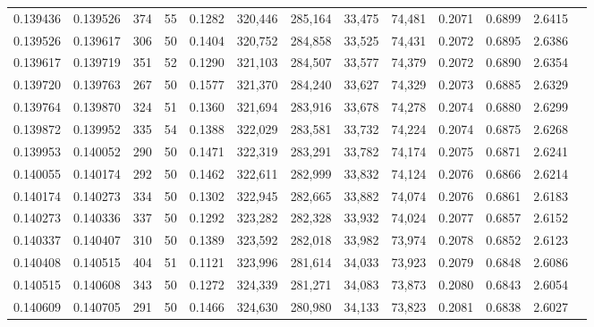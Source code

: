 \begin{tabular}{rrrrrrrrrrrrr}
0.139436 & 0.139526 &   374 &  55 &                                     0.1282 & 320,446 & 285,164 &  33,475 &  74,481 & 0.2071 & 0.6899 & 2.6415 \\
0.139526 & 0.139617 &   306 &  50 &                                     0.1404 & 320,752 & 284,858 &  33,525 &  74,431 & 0.2072 & 0.6895 & 2.6386 \\
0.139617 & 0.139719 &   351 &  52 &                                     0.1290 & 321,103 & 284,507 &  33,577 &  74,379 & 0.2072 & 0.6890 & 2.6354 \\
0.139720 & 0.139763 &   267 &  50 &                                     0.1577 & 321,370 & 284,240 &  33,627 &  74,329 & 0.2073 & 0.6885 & 2.6329 \\
0.139764 & 0.139870 &   324 &  51 &                                     0.1360 & 321,694 & 283,916 &  33,678 &  74,278 & 0.2074 & 0.6880 & 2.6299 \\
0.139872 & 0.139952 &   335 &  54 &                                     0.1388 & 322,029 & 283,581 &  33,732 &  74,224 & 0.2074 & 0.6875 & 2.6268 \\
0.139953 & 0.140052 &   290 &  50 &                                     0.1471 & 322,319 & 283,291 &  33,782 &  74,174 & 0.2075 & 0.6871 & 2.6241 \\
0.140055 & 0.140174 &   292 &  50 &                                     0.1462 & 322,611 & 282,999 &  33,832 &  74,124 & 0.2076 & 0.6866 & 2.6214 \\
0.140174 & 0.140273 &   334 &  50 &                                     0.1302 & 322,945 & 282,665 &  33,882 &  74,074 & 0.2076 & 0.6861 & 2.6183 \\
0.140273 & 0.140336 &   337 &  50 &                                     0.1292 & 323,282 & 282,328 &  33,932 &  74,024 & 0.2077 & 0.6857 & 2.6152 \\
0.140337 & 0.140407 &   310 &  50 &                                     0.1389 & 323,592 & 282,018 &  33,982 &  73,974 & 0.2078 & 0.6852 & 2.6123 \\
0.140408 & 0.140515 &   404 &  51 &                                     0.1121 & 323,996 & 281,614 &  34,033 &  73,923 & 0.2079 & 0.6848 & 2.6086 \\
0.140515 & 0.140608 &   343 &  50 &                                     0.1272 & 324,339 & 281,271 &  34,083 &  73,873 & 0.2080 & 0.6843 & 2.6054 \\
0.140609 & 0.140705 &   291 &  50 &                                     0.1466 & 324,630 & 280,980 &  34,133 &  73,823 & 0.2081 & 0.6838 & 2.6027 \\

\end{tabular}
